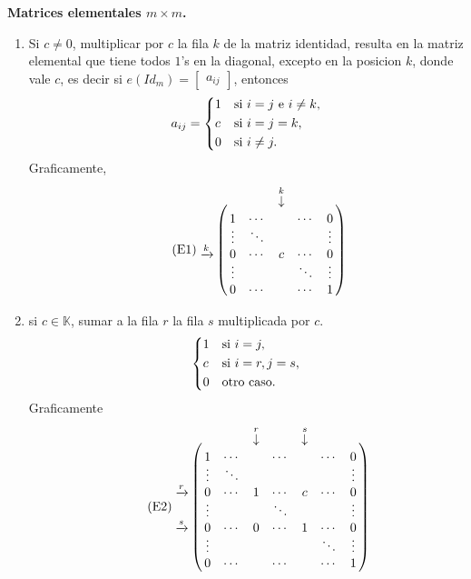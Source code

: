\documentclass{article}
\theoremstyle{definition}
\theoremstyle{definition}
\theoremstyle{remark}
\let\bbordermatrix\bordermatrix
\begin{document}
\begin{center}
\textbf{Matrices elementales $m \times m$.}
\end{center}
\begin{enumerate}[label=\textcolor{azulp2}{E\arabic*.}]
\item Si $ c\neq 0$, multiplicar por $c$ la fila $k$ de la matriz identidad, resulta en la matriz elemental que tiene todos $1$'s en la diagonal, excepto en la posicion $k$, donde vale $c$, es decir si $e(Id_m)=\begin{bmatrix}a_{ij}\end{bmatrix}$, entonces \[
  a_{ij}=\begin{dcases}1 & \text{si }i=j \text{ e } i \neq k, \\
    c & \text{si }i = j = k, \\
  0 & \text{si }i \neq j. \end{dcases}
  \]
  Graficamente, \begin{equation}\tag{E1}
    \bbordermatrix{
      ~ &  &  & \overset{k}{\downarrow} \cr
        & 1 & \cdots &  & \cdots & 0 \cr
        & \vdots & \ddots &  &  & \vdots \cr
       \xrightarrow{k} & 0 & \cdots & c & \cdots & 0 \cr
        & \vdots & & & \ddots & \vdots \cr 
        & 0 & \cdots & & \cdots & 1 \cr
    } \end{equation}
  \item si $c \in \mathbb{K}$, sumar a la fila $r$ la fila $s$ multiplicada por $c$. \[
      \begin{dcases}
        1 & \text{si } i =j, \\
        c & \text{si }i = r, j =s, \\
      0 & \text{otro caso.}\end{dcases}
    \]
    Graficamente \begin{equation}\tag{E2} 
      \bbordermatrix{ 
        ~& && \overset{r}{\downarrow} & & \overset{s}{\downarrow} \cr 
         & 1 & \cdots & & \cdots & & \cdots & 0 \cr
         & \vdots & \ddots & & & && \vdots \cr 
        \xrightarrow{r} & 0 & \cdots & 1 & \cdots & c & \cdots & 0 \cr 
                        & \vdots & & & \ddots & & & \vdots \cr
                      \xrightarrow{s}  & 0 & \cdots & 0 & \cdots & 1 & \cdots & 0 \cr
        & \vdots & & & && \ddots  & \vdots\cr
                        & 0 & \cdots &  & \cdots &  & \cdots &   1 \cr
      }
    \end{equation}\pagebreak


\end{enumerate}
\end{document}

